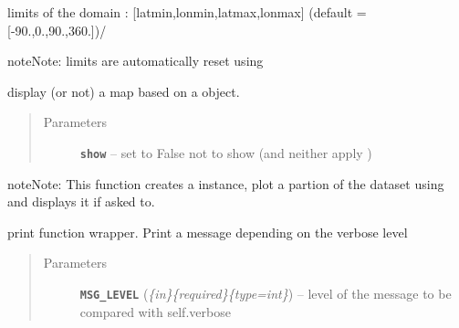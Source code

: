 \documentclass[letterpaper,10pt,english]{sphinxmanual}
\begin{document}
\begin{fulllineitems}
\begin{fulllineitems}
\end{fulllineitems}


\begin{fulllineitems}
\label{altimetry.data:altimetry.data.hydro_data.limit}
limits of the domain : {[}latmin,lonmin,latmax,lonmax{]} (default = {[}-90.,0.,90.,360.{]})/

\begin{notice}{note}{Note:}
limits are automatically reset using 
\end{notice}

\end{fulllineitems}


\begin{fulllineitems}
\label{altimetry.data:altimetry.data.hydro_data.map}
display (or not) a map based on a  object.
\begin{quote}\begin{description}
\item[{Parameters}] \leavevmode
\textbf{\texttt{show}} -- set to False not to show (and neither apply )

\end{description}\end{quote}

\begin{notice}{note}{Note:}
This function creates a  instance, plot a partion of the dataset using {\hyperref[altimetry.data:altimetry.data.hydro_data.plot_track]{\emph{}}} and displays it if asked to.
\end{notice}

\end{fulllineitems}


\begin{fulllineitems}
\label{altimetry.data:altimetry.data.hydro_data.message}
print function wrapper. Print a message depending on the verbose level
\begin{quote}\begin{description}
\item[{Parameters}] \leavevmode
\textbf{\texttt{MSG\_LEVEL}} (\emph{\{in\}\{required\}\{type=int\}}) -- level of the message to be compared with self.verbose


\end{description}
\end{quote}
\end{fulllineitems}
\end{fulllineitems}
\end{document}
